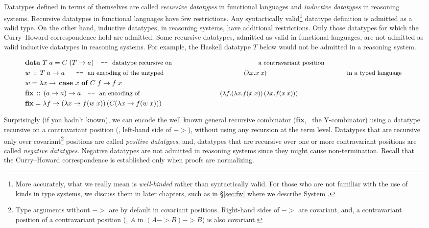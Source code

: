 Datatypes defined in terms of themselves are called \emph{recursive datatypes}
in functional languages and \emph{inductive datatypes} in reasoning systems.
Recursive datatypes in functional languages have few restrictions.
Any syntactically valid\footnote{
        More accurately, what we really mean is \emph{well-kinded} rather than
        syntactically valid. 
        For those who are not familiar with the use of kinds in type systems, 
        we discuss them in later chapters, such as
        in \S\ref{sec:fw} where we describe System \Fw.}
datatype definition is admitted as a valid type. On the other hand,
inductive datatypes, in reasoning systems, have additional restrictions.
Only those datatypes for which the Curry--Howard correspondence hold are
admitted. Some recursive datatypes, admitted as valid in functional languages,
are not admitted as valid inductive datatypes in reasoning systems. For example,
the Haskell datatype $T$ below would not be admitted in a reasoning system.
\begin{singlespace}
\begin{align*}
& \textbf{data}~T\;a = C\;(T -> a) \quad
          \texttt{-}\texttt{-}~\text{\small datatype recursive on
                                        a contravariant position} \\
& w \,::\, T\;a -> a ~~ \quad
          \texttt{-}\texttt{-}~\text{\small an encoding of the untyped
                                     $(\lambda x.x\;x)$
                                     in a typed language}~ \\
& w = \lambda x -> \,\textbf{case}~x~\textbf{of}~C\;f -> f\;x \\
& \textbf{fix} \,::\, (a -> a) -> a \quad
          \texttt{-}\texttt{-}~\text{\small an encoding of 
                                     $(\lambda f.(\lambda x.f(x\;x))\,
                                                 (\lambda x.f(x\;x)))$} \\
& \textbf{fix} = \lambda f -> (\lambda x -> f (w\;x))\,(C(\lambda x -> f (w\;x)))
\end{align*}
\end{singlespace}\noindent
Surprisingly (if you hadn't known), we can encode the well known
general recursive combinator (\textbf{fix}, \aka\ the \textsf{Y}-combinator)
using a datatype recursive on a contravariant position (\ie, left-hand side of
$->$), without using any recursion at the term level.
Datatypes that are recursive only over covariant\footnote{Type arguments
        without $->$ are by default in covariant positions. Right-hand sides
        of $->$ are covariant, and, a contravariant position of
        a contravariant position (\eg, $A$ in $(A -> B) -> B$) is
        also covariant.}
positions are called \emph{positive datatypes}, and, datatypes
that are recursive over one or more contravariant positions are
called \emph{negative datatypes}. Negative datatypes are not admitted
in reasoning systems since they might cause non-termination. Recall that
the Curry--Howard correspondence is established only when proofs are normalizing.

